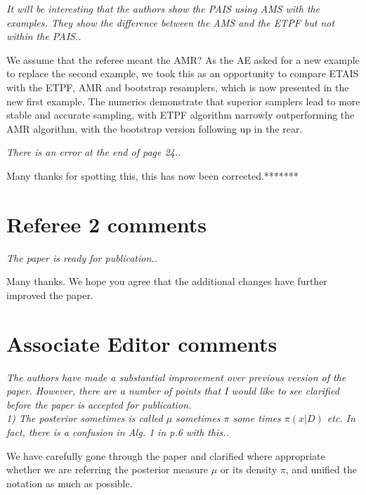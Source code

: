 \documentclass{article}
\newcommand{\comment}[2]{\vspace{0.6cm}{\bf Comment:} {\it #1.}

\vspace{0.3cm}{\bf Answer:} #2}
\begin{document}
\comment{It will be interesting that the authors show the PAIS using AMS with the examples. They show the difference between the AMS and the ETPF but not within the PAIS.}{We assume that the referee meant the AMR? As the AE asked for a new example to replace the second example, we took this as an opportunity to compare ETAIS with the ETPF, AMR and bootstrap resamplers, which is now presented in the new first example. The numerics demonstrate that superior samplers lead to more stable and accurate sampling, with ETPF algorithm narrowly outperforming the AMR algorithm, with the bootstrap version following up in the rear.}

\comment{There is an error at the end of page 24.}{Many thanks for spotting this, this has now been corrected.*******}

\section*{Referee 2 comments}
\comment{The paper is ready for publication.}{Many thanks. We hope you agree that the additional changes have further improved the paper.}

\section*{Associate Editor comments}

\comment{The authors have made a substantial improvement over previous version of the paper. However, there are a number of points that I would like to see clarified before the paper is accepted for publication.\\
1) The posterior sometimes is called $\mu$ sometimes $\pi$ some times $\pi(x|D)$ etc. In fact, there is a confusion in Alg. 1 in p.6 with this.}{We have carefully gone through the paper and clarified where appropriate whether we are referring the posterior measure $\mu$ or its density $\pi$, and unified the notation as much as possible.}
\end{document}
